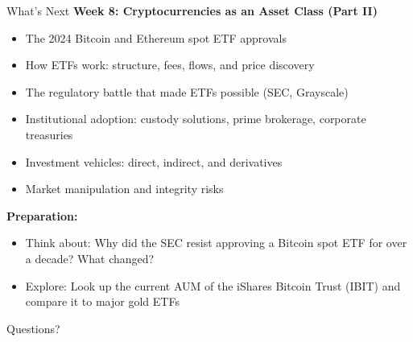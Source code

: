 \documentclass[10pt]{beamer}
\begin{document}
\begin{frame}{What's Next}
  \textbf{Week 8: Cryptocurrencies as an Asset Class (Part II)}
  \begin{itemize}
    \item The 2024 Bitcoin and Ethereum spot ETF approvals
    \item How ETFs work: structure, fees, flows, and price discovery
    \item The regulatory battle that made ETFs possible (SEC, Grayscale)
    \item Institutional adoption: custody solutions, prime brokerage, corporate treasuries
    \item Investment vehicles: direct, indirect, and derivatives
    \item Market manipulation and integrity risks
  \end{itemize}
  
  \vspace{1em}
  \textbf{Preparation:}
  \begin{itemize}
    \item Think about: Why did the SEC resist approving a Bitcoin spot ETF for over a decade? What changed?
    \item Explore: Look up the current AUM of the iShares Bitcoin Trust (IBIT) and compare it to major gold ETFs
  \end{itemize}
\end{frame}

\begin{frame}[plain]
  \vfill
  \begin{center}
    {\Large Questions?}
  \end{center}
  \vfill
\end{frame}
\end{document}
